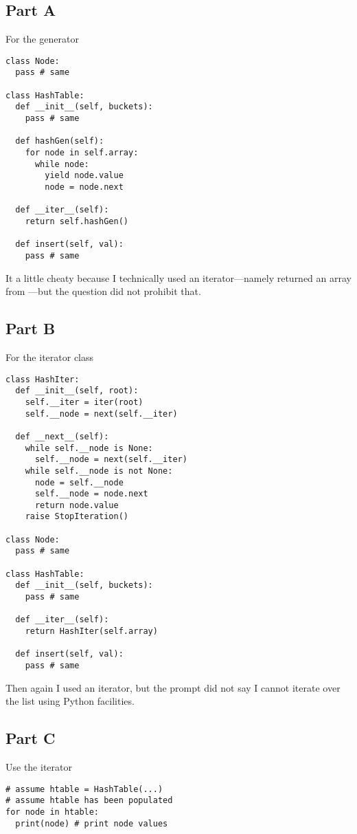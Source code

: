 \subsection*{Part A}
For the generator
\begin{verbatim}
class Node:
  pass # same

class HashTable:
  def __init__(self, buckets):
    pass # same

  def hashGen(self):
    for node in self.array:
      while node:
        yield node.value
        node = node.next

  def __iter__(self):
    return self.hashGen()

  def insert(self, val):
    pass # same
\end{verbatim}
\noindent
It a little cheaty because I technically used an iterator---namely
returned an array from ---but the question did not
prohibit that.

\subsection*{Part B}
For the iterator class
\begin{verbatim}
class HashIter:
  def __init__(self, root):
    self.__iter = iter(root)
    self.__node = next(self.__iter)

  def __next__(self):
    while self.__node is None:
      self.__node = next(self.__iter)
    while self.__node is not None:
      node = self.__node
      self.__node = node.next
      return node.value
    raise StopIteration()

class Node:
  pass # same

class HashTable:
  def __init__(self, buckets):
    pass # same

  def __iter__(self):
    return HashIter(self.array)

  def insert(self, val):
    pass # same
\end{verbatim}
\noindent
Then again I used an iterator, but the prompt did not say I cannot
iterate over the list using Python facilities.

\subsection*{Part C}
Use the iterator
\begin{verbatim}
# assume htable = HashTable(...)
# assume htable has been populated
for node in htable:
  print(node) # print node values
\end{verbatim}

